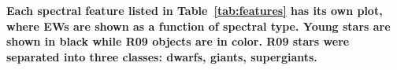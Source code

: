 {\bf Each spectral feature listed in Table~\ref{tab:features} has its own plot, where EWs are shown as a function of spectral type.  Young stars are shown in black while R09 objects are in color.  R09 stars were separated into three classes: dwarfs, giants, supergiants.\label{fig:EW-separate-obs-R09}}